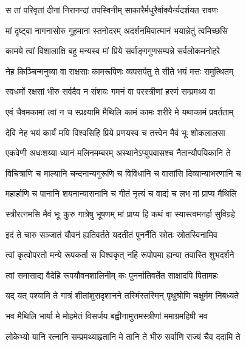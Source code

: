 
\twolineshloka
{स तां परिवृतां दीनां निरानन्दां तपस्विनीम्}
{साकारैर्मधुरैर्वाक्यैर्न्यदर्शयत रावणः} %

\twolineshloka
{मां दृष्ट्वा नागनासोरु गूहमाना स्तनोदरम्}
{अदर्शनमिवात्मानं भयान्नेतुं त्वमिच्छसि} %

\twolineshloka
{कामये त्वां विशालाक्षि बहु मन्यस्व मां प्रिये}
{सर्वाङ्गगुणसम्पन्ने सर्वलोकमनोहरे} %

\twolineshloka
{नेह किञ्चिन्मनुष्या वा राक्षसाः कामरूपिणः}
{व्यपसर्पतु ते सीते भयं मत्तः समुत्थितम्} %

\twolineshloka
{स्वधर्मो रक्षसां भीरु सर्वदैव न संशयः}
{गमनं वा परस्त्रीणां हरणं सम्प्रमथ्य वा} %

\twolineshloka
{एवं चैवमकामां त्वां न च स्प्रक्ष्यामि मैथिलि}
{कामं कामः शरीरे मे यथाकामं प्रवर्तताम्} %

\twolineshloka
{देवि नेह भयं कार्यं मयि विश्वसिहि प्रिये}
{प्रणयस्व च तत्त्वेन मैवं भूः शोकलालसा} %

\twolineshloka
{एकवेणी अधःशय्या ध्यानं मलिनमम्बरम्}
{अस्थानेऽप्युपवासश्च नैतान्यौपयिकानि ते} %

\twolineshloka
{विचित्राणि च माल्यानि चन्दनान्यगुरूणि च}
{विविधानि च वासांसि दिव्यान्याभरणानि च} %

\twolineshloka
{महार्हाणि च पानानि शयनान्यासनानि च}
{गीतं नृत्यं च वाद्यं च लभ मां प्राप्य मैथिलि} %

\twolineshloka
{स्त्रीरत्नमसि मैवं भूः कुरु गात्रेषु भूषणम्}
{मां प्राप्य हि कथं वा स्यास्त्वमनर्हा सुविग्रहे} %

\twolineshloka
{इदं ते चारु सञ्जातं यौवनं ह्यतिवर्तते}
{यदतीतं पुनर्नैति स्रोतः स्रोतस्विनामिव} %

\twolineshloka
{त्वां कृत्वोपरतो मन्ये रूपकर्ता स विश्वकृत्}
{नहि रूपोपमा ह्यन्या तवास्ति शुभदर्शने} %

\twolineshloka
{त्वां समासाद्य वैदेहि रूपयौवनशालिनीम्}
{कः पुनर्नातिवर्तेत साक्षादपि पितामहः} %

\twolineshloka
{यद् यत् पश्यामि ते गात्रं शीतांशुसदृशानने}
{तस्मिंस्तस्मिन् पृथुश्रोणि चक्षुर्मम निबध्यते} %

\twolineshloka
{भव मैथिलि भार्या मे मोहमेतं विसर्जय}
{बह्वीनामुत्तमस्त्रीणां ममाग्रमहिषी भव} %

\twolineshloka
{लोकेभ्यो यानि रत्नानि सम्प्रमथ्याहृतानि मे}
{तानि ते भीरु सर्वाणि राज्यं चैव ददामि ते} %

